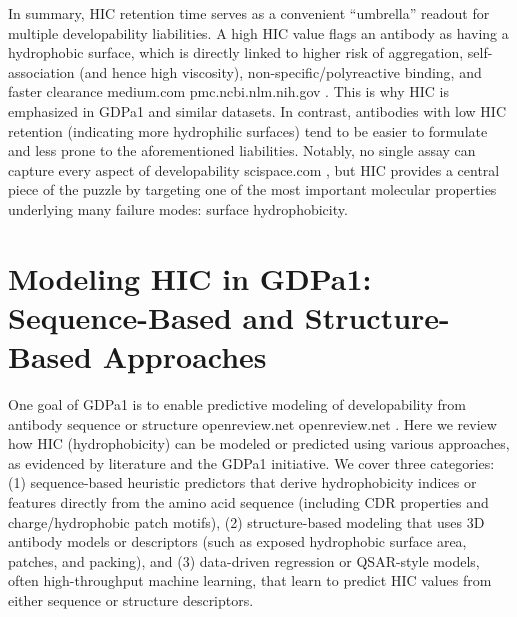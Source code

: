 \documentclass[12pt]{article}
\begin{document}
In summary, HIC retention time serves as a convenient “umbrella” readout for multiple developability liabilities. A high HIC value flags an antibody as having a hydrophobic surface, which is directly linked to higher risk of aggregation, self-association (and hence high viscosity), non-specific/polyreactive binding, and faster clearance
medium.com
pmc.ncbi.nlm.nih.gov
. This is why HIC is emphasized in GDPa1 and similar datasets. In contrast, antibodies with low HIC retention (indicating more hydrophilic surfaces) tend to be easier to formulate and less prone to the aforementioned liabilities. Notably, no single assay can capture every aspect of developability
scispace.com
, but HIC provides a central piece of the puzzle by targeting one of the most important molecular properties underlying many failure modes: surface hydrophobicity.

\section{Modeling HIC in GDPa1: Sequence-Based and Structure-Based Approaches}
One goal of GDPa1 is to enable predictive modeling of developability from antibody sequence or structure
openreview.net
openreview.net
. Here we review how HIC (hydrophobicity) can be modeled or predicted using various approaches, as evidenced by literature and the GDPa1 initiative. We cover three categories: (1) sequence-based heuristic predictors that derive hydrophobicity indices or features directly from the amino acid sequence (including CDR properties and charge/hydrophobic patch motifs), (2) structure-based modeling that uses 3D antibody models or descriptors (such as exposed hydrophobic surface area, patches, and packing), and (3) data-driven regression or QSAR-style models, often high-throughput machine learning, that learn to predict HIC values from either sequence or structure descriptors.
\end{document}
